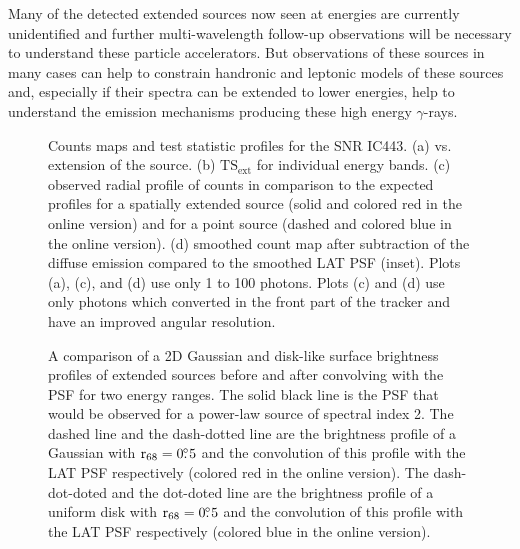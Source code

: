 \documentclass[12pt,preprint]{aastex}
\newif\ifcolorfigure
\newcommand{\gev}{\text{GeV}\xspace}
\newcommand{\tev}{\text{TeV}\xspace}
\newcommand{\tsext}{{\ensuremath{\text{TS}_{\text{ext}}}}\xspace}
\newcommand{\rsixeight}{{\ensuremath{\text{r}_{68}}}\xspace}
\newcommand{\ts}{\text{TS}\xspace}
\begin{document}
{Many of the \tev detected extended sources now seen at \gev energies are
currently unidentified and further multi-wavelength follow-up observations
will be necessary to understand these particle accelerators. But \gev
observations of these \tev sources in many cases can help to constrain
handronic and leptonic models of these sources and, especially if their
spectra can be extended to lower energies, help to understand the emission
mechanisms producing these high energy $\gamma$-rays.  
}




\clearpage
\begin{figure}
    \ifcolorfigure
    \plotone{ic443_plots/four_plots_ic443_color.eps}
    \else
    \fi
    \caption{
    Counts maps and test statistic profiles for the SNR IC443. (a) \ts
    vs. extension of the source. (b) \tsext for individual energy
    bands. (c) observed radial profile of counts in comparison to the
    expected profiles for a spatially extended source (solid and colored
    red in the online version) and for a point source (dashed and colored
    blue in the online version).  (d) smoothed count map after subtraction
    of the diffuse emission compared to the smoothed
    LAT PSF (inset).  Plots (a),
    (c), and (d) use only 1 \gev to 100 \gev photons.  Plots (c) and (d) use
    only photons which converted in the front part of the tracker and
    have an improved angular resolution.
    }
    \label{four_plots_ic443}
\end{figure}

\clearpage
\begin{figure}
    \ifcolorfigure
      \plotone{mc_plots/compare_disk_gauss_color.eps}
    \else
    \fi
    \caption{
    A comparison of a 2D Gaussian and disk-like surface brightness profiles
    of extended sources before and after convolving with the PSF for two
    energy ranges.  The solid black line is the PSF that would be observed
    for a power-law source of spectral index 2. The dashed line
    and the dash-dotted line are 
    the brightness profile of a Gaussian with $\rsixeight=0\fdg5$
    and the convolution of this profile with the LAT PSF respectively
    (colored red in the online version).
    The dash-dot-doted and the dot-doted line are the brightness profile
    of a uniform disk with $\rsixeight=0\fdg5$ and the convolution
    of this profile with the LAT PSF respectively (colored blue in the online version).
    }\label{compare_disk_gauss}
  \end{figure}
\end{document}
